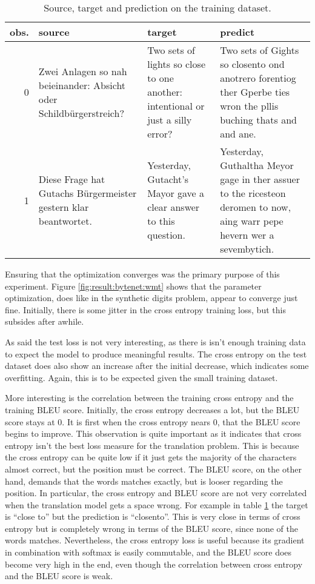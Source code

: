 \begin{table}[h]
\centering
\begin{tabular}{r|p{3.3cm} p{3.3cm} p{3.3cm}}
	obs. & source & target & predict\\ \hline
  0  & Zwei Anlagen so nah beieinander: Absicht oder Schildbürgerstreich? & Two sets of lights so close to one another: intentional or just a silly error? & Two sets of Gights so closento ond anotrero forentiog ther Gperbe ties wron the pllis buching thats and and ane. \\
  1 & Diese Frage hat Gutachs Bürgermeister gestern klar beantwortet. & Yesterday, Gutacht's Mayor gave a clear answer to this question. & Yesterday, Guthaltha Meyor gage in ther assuer to the ricesteon deromen to now, aing warr pepe hevern wer a sevembytich.
\end{tabular}
\caption{Source, target and prediction on the training dataset.}
\label{table:result:bytenet:wmt-train}
\end{table}

Ensuring that the optimization converges was the primary purpose of this experiment. Figure \ref{fig:result:bytenet:wmt} shows that the parameter optimization, does like in the synthetic digits problem, appear to converge just fine. Initially, there is some jitter in the cross entropy training loss, but this subsides after awhile. 

As said the test loss is not very interesting, as there is isn't enough training data to expect the model to produce meaningful results. The cross entropy on the test dataset does also show an increase after the initial decrease, which indicates some overfitting. Again, this is to be expected given the small training dataset.

More interesting is the correlation between the training cross entropy and the training BLEU score. Initially, the cross entropy decreases a lot, but the BLEU score stays at 0. It is first when the cross entropy nears 0, that the BLEU score begins to improve. This observation is quite important as it indicates that cross entropy isn't the best loss measure for the translation problem. This is because the cross entropy can be quite low if it just gets the majority of the characters almost correct, but the position must be correct. The BLEU score, on the other hand, demands that the words matches exactly, but is looser regarding the position. In particular, the cross entropy and BLEU score are not very correlated when the translation model gets a space wrong. For example in table \ref{table:result:bytenet:wmt-train} the target is ``close to'' but the prediction is ``closento''. This is very close in terms of cross entropy but is completely wrong in terms of the BLEU score, since none of the words matches. Nevertheless, the cross entropy loss is useful because its gradient in combination with softmax is easily commutable, and the BLEU score does become very high in the end, even though the correlation between cross entropy and the BLEU score is weak.


